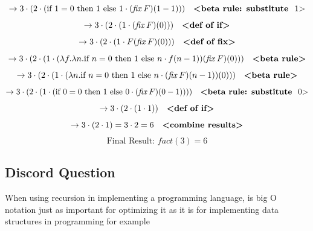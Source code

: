 \documentclass{article}
\theoremstyle{plain}
\theoremstyle{definition}
\theoremstyle{remark}
\begin{document}
\[
\to 3 \cdot (2 \cdot (\text{if } 1 = 0 \text{ then } 1 \text{ else } 1 \cdot (\mathit{fix} \, F)(1-1))) \quad \text{\textbf{<beta rule: substitute } 1\text{>}}
\]
\[
\to 3 \cdot (2 \cdot (1 \cdot (\mathit{fix} \, F)(0))) \quad \text{\textbf{<def of if>}}
\]
\[
\to 3 \cdot (2 \cdot (1 \cdot F(\mathit{fix} \, F)(0))) \quad \text{\textbf{<def of fix>}}
\]
\[
\to 3 \cdot (2 \cdot (1 \cdot (\lambda f. \lambda n. \text{if } n = 0 \text{ then } 1 \text{ else } n \cdot f(n-1))(\mathit{fix} \, F)(0))) \quad \text{\textbf{<beta rule>}}
\]
\[
\to 3 \cdot (2 \cdot (1 \cdot (\lambda n. \text{if } n = 0 \text{ then } 1 \text{ else } n \cdot (\mathit{fix} \, F)(n-1))(0))) \quad \text{\textbf{<beta rule>}}
\]
\[
\to 3 \cdot (2 \cdot (1 \cdot (\text{if } 0 = 0 \text{ then } 1 \text{ else } 0 \cdot (\mathit{fix} \, F)(0-1)))) \quad \text{\textbf{<beta rule: substitute } 0\text{>}}
\]
\[
\to 3 \cdot (2 \cdot (1 \cdot 1)) \quad \text{\textbf{<def of if>}}
\]
\[
\to 3 \cdot (2 \cdot 1) = 3 \cdot 2 = 6 \quad \text{\textbf{<combine results>}}
\]
\[
\text{Final Result: } \mathit{fact}(3) = 6
\]

\subsection{Discord Question}

When using recursion in implementing a programming language, is big O notation just as important for optimizing it as it is for implementing data structures in programming for example
\end{document}
